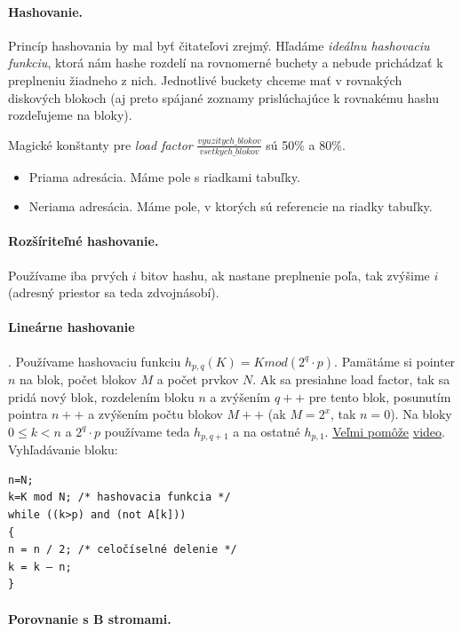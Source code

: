 \documentclass[10pt,a4paper]{article}
\begin{document}
\paragraph{Hashovanie.}
Princíp hashovania by mal byť čitateľovi zrejmý. Hľadáme \emph{ideálnu hashovaciu funkciu},
ktorá nám hashe rozdelí na rovnomerné buchety a nebude prichádzať k preplneniu žiadneho z nich. 
Jednotlivé buckety chceme mať v rovnakých diskových blokoch (aj preto spájané zoznamy prislúchajúce k rovnakému hashu rozdeľujeme na bloky). 

Magické konštanty pre \emph{load factor} $\frac{vyuzitych\_blokov}{vsetkych\_blokov}$ sú 50\% a 80\%. 

\begin{itemize}
\item Priama adresácia. Máme pole s riadkami tabuľky.
\item Neriama adresácia. Máme pole, v ktorých sú referencie na riadky tabuľky. 
\end{itemize}

\paragraph{Rozšíriteľné hashovanie.} 
Používame iba prvých $i$ bitov hashu, ak nastane preplnenie poľa, tak zvýšime $i$ (adresný priestor sa teda zdvojnásobí). 

\paragraph{Lineárne hashovanie}. 
Používame hashovaciu funkciu $h_{p,q}(K)=K mod (2^q \cdot p)$. Pamätáme si pointer $n$ na blok, počet blokov $M$ a počet prvkov $N$.
Ak sa presiahne load factor, tak sa pridá nový blok, rozdelením bloku $n$ a zvýšením $q++$ pre tento blok, posunutím pointra $n++$ a zvýšením počtu blokov $M++$ (ak $M=2^x$, tak $n=0$).
Na bloky $0 \leq k < n$ a $2^q \cdot p$ používame teda $h_{p,q+1}$ a na ostatné $h_{p,1}$.
\underline{Veľmi pomôže} \href{http://www.youtube.com/watch?v=Yw1ts57uL7c}{video}. Vyhľadávanie bloku: 
\begin{verbatim}
n=N;
k=K mod N; /* hashovacia funkcia */
while ((k>p) and (not A[k]))
{
n = n / 2; /* celočíselné delenie */
k = k – n;
}
\end{verbatim} 

\paragraph{Porovnanie s B stromami.}
\end{document}

